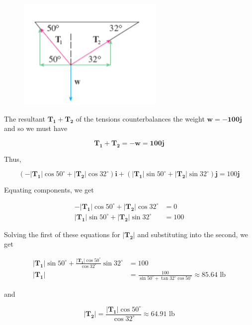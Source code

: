         \begin{figure}[hbt!]
            \centering
            \includegraphics[scale = 0.75]{Resources/12.2_Tension2}
        \end{figure}

        The resultant $\mathbf{T_1 + T_2}$ of the tensions counterbalances the weight $\mathbf{w = -100j}$ and so we must have

        \[
            \mathbf{T_1 + T_2 = -w = 100j}
        \]

        Thus,

        \[
            \left(-|\mathbf{T_1}|\cos{50^{\circ}}+|\mathbf{T_2}|\cos{32^{\circ}}\right)\mathbf{i} + \left(|\mathbf{T_1}|\sin{50^{\circ}} + |\mathbf{T_2}|\sin{32^{\circ}}\right)\mathbf{j} = 100\mathbf{j}
        \]

        Equating components, we get

        \begin{align*}
            -|\mathbf{T_1}|\cos{50^{\circ}} + |\mathbf{T_2}|\cos{32^{\circ}}  &= 0 \\
            |\mathbf{T_1}|\sin{50^{\circ}} + |\mathbf{T_2}|\sin{32^{\circ}}   &= 100
        \end{align*}

        Solving the first of these equations for $|\mathbf{T_2}|$ and substituting into the second, we get

        \begin{align*}
            |\mathbf{T_1}|\sin{50^{\circ}} + \frac{|\mathbf{T_1}|\cos{50^{\circ}}}{\cos{32^{\circ}}}\sin{32^{\circ}}    &= 100 \\
            |\mathbf{T_1}|   &= \frac{100}{\sin{50^{\circ}}+\tan{32^{\circ}}\cos{50^{\circ}}}    \approx 85.64 \text{ lb}
        \end{align*}

        and

        \[
            |\mathbf{T_2}| = \frac{|\mathbf{T_1}|\cos{50^{\circ}}}{\cos{32^{\circ}}}    \approx 64.91 \text{ lb}
        \]

